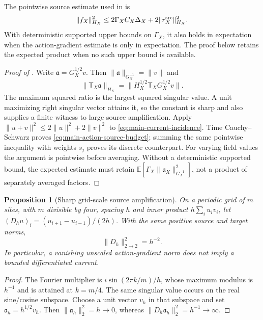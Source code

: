\documentclass[11pt]{article}
\numberwithin{equation}{section}
\newtheorem{proposition}[proposition]{Proposition}
\theoremstyle{definition}
\theoremstyle{remark}
\begin{document}
The pointwise source estimate used in
 is
\begin{equation}
 \|f_X\|_{H_X}^2
       \le2\Gamma_XC_X\Delta_X+2\|r_X^{\rm src}\|_{H_X}^2.
 \label{eq:supp-curvature-source-budget}
\end{equation}
With deterministic supported upper bounds on $\Gamma_X$, it also holds in
expectation when the action-gradient estimate is only in expectation.
The proof below retains the expected product when no such upper bound is
available.

\begin{proof}[Proof of ]
Write $\mathfrak a=G_X^{1/2}v$.  Then
$\|\mathfrak a\|_{G_X^{-1}}=\|v\|$ and
\[
 \|\mathsf T_X\mathfrak a\|_{H_X}
       =\|H_X^{1/2}\mathsf T_XG_X^{1/2}v\|.
\]
The maximum squared ratio is the largest squared singular value.  A unit
maximizing right singular vector attains it, so the constant is sharp and
also supplies a finite witness to large source amplification.
Apply $\|u+v\|^2\le2\|u\|^2+2\|v\|^2$ to
\eqref{eq:main-current-incidence}.  Time Cauchy--Schwarz proves
\eqref{eq:main-action-source-budget}; summing the same pointwise inequality
with weights $s_j$ proves its discrete counterpart.  For varying field
values the argument is pointwise before averaging.  Without a deterministic
supported bound, the expected estimate must retain
$\mathbb E[\Gamma_X\|\mathfrak a_X\|_{G_X^{-1}}^2]$, not a product of
separately averaged factors.
\end{proof}

\begin{proposition}[Sharp grid-scale source amplification]
\label{prop:supp-current-derivative-loss}
On a periodic grid of $m$ sites, with $m$ divisible by four, spacing $h$ and
inner product $h\sum_i u_iv_i$, let
$(D_hu)_i=(u_{i+1}-u_{i-1})/(2h)$.  With the same positive source and target
norms,
\begin{equation}
 \|D_h\|_{2\to2}^2=h^{-2}.
 \label{eq:supp-current-derivative-loss}
\end{equation}
In particular, a vanishing unscaled action-gradient norm does not imply a
bounded differentiated current.
\end{proposition}
\begin{proof}
The Fourier multiplier is $i\sin(2\pi k/m)/h$, whose maximum modulus is
$h^{-1}$ and is attained at $k=m/4$.  The same singular value occurs on the
real sine/cosine subspace.  Choose a unit vector $v_h$ in that subspace and
set $\mathfrak a_h=h^{1/2}v_h$.  Then
$\|\mathfrak a_h\|_2^2=h\to0$, whereas
$\|D_h\mathfrak a_h\|_2^2=h^{-1}\to\infty$.
\end{proof}
\end{document}
